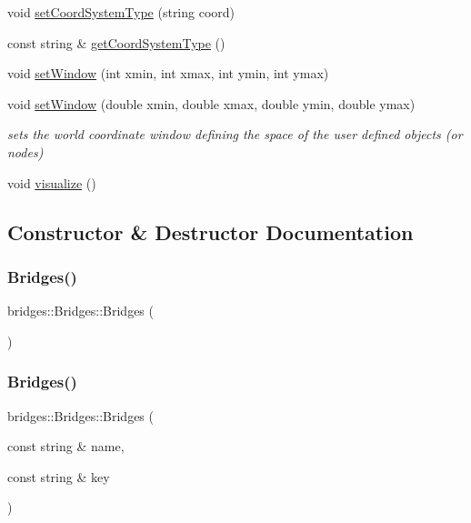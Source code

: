 \begin{DoxyCompactItemize}
void \hyperlink{classbridges_1_1_bridges_ad00c07d3a028110424909081a94c4013}{set\+Coord\+System\+Type} (string coord)
\item 
const string \& \hyperlink{classbridges_1_1_bridges_aac3cdb607177ff537f5160c3790d814a}{get\+Coord\+System\+Type} ()
\item 
void \hyperlink{classbridges_1_1_bridges_a0465bca83056a72ba4db82b60e622163}{set\+Window} (int xmin, int xmax, int ymin, int ymax)
\item 
void \hyperlink{classbridges_1_1_bridges_aa0bfa955d36a85fa9ffa31a0bc6c19c4}{set\+Window} (double xmin, double xmax, double ymin, double ymax)
\begin{DoxyCompactList}\small\item\em sets the world coordinate window defining the space of the user defined objects (or nodes) \end{DoxyCompactList}\item 
void \hyperlink{classbridges_1_1_bridges_a2806e395134614cdd6327400b53d28ad}{visualize} ()
\end{DoxyCompactItemize}


\subsection{Constructor \& Destructor Documentation}
\mbox{\label{classbridges_1_1_bridges_aab8b250b2b5ba0034ceb2494fe5ea437}} 
\subsubsection{\texorpdfstring{Bridges()}{Bridges()}\hspace{0.1cm}{\footnotesize\ttfamily [1/3]}}
{\footnotesize\ttfamily bridges\+::\+Bridges\+::\+Bridges (\begin{DoxyParamCaption}{ }\end{DoxyParamCaption})\hspace{0.3cm}{\ttfamily [inline]}}

\mbox{\label{classbridges_1_1_bridges_a21d9e98cb1f3994300079b489f14e71e}} 
\subsubsection{\texorpdfstring{Bridges()}{Bridges()}\hspace{0.1cm}{\footnotesize\ttfamily [2/3]}}
{\footnotesize\ttfamily bridges\+::\+Bridges\+::\+Bridges (\begin{DoxyParamCaption}\item[{const string \&}]{name,  }\item[{const string \&}]{key }\end{DoxyParamCaption})\hspace{0.3cm}{\ttfamily [inline]}}



